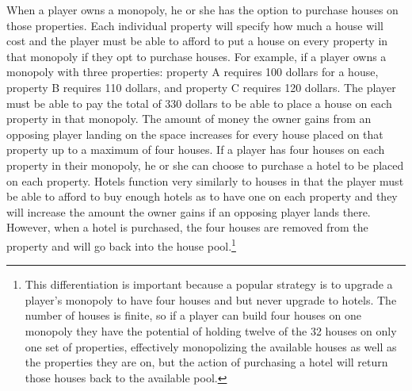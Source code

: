 \documentclass{article}
\begin{document}
When a player owns a monopoly, he or she has the option to purchase houses on those properties.  Each individual property will specify how much a house will cost and the player must be able to afford to put a house on every property in that monopoly if they opt to purchase houses.  For example, if a player owns a monopoly with three properties: property A requires 100 dollars for a house, property B requires 110 dollars, and property C requires 120 dollars.  The player must be able to pay the total of 330 dollars to be able to place a house on each property in that monopoly.  The amount of money the owner gains from an opposing player landing on the space increases for every house placed on that property up to a maximum of four houses.  If a player has four houses on each property in their monopoly, he or she can choose to purchase a hotel to be placed on each property.  Hotels function very similarly to houses in that the player must be able to afford to buy enough hotels as to have one on each property and they will increase the amount the owner gains if an opposing player lands there. However, when a hotel is purchased, the four houses are removed from the property and will go back into the house pool.\cite{rules}\footnote{This differentiation is important because a popular strategy is to upgrade a player's monopoly to have four houses and but never upgrade to hotels.  The number of houses is finite, so if a player can build four houses on one monopoly they have the potential of holding twelve of the 32 houses on only one set of properties, effectively monopolizing the available houses as well as the properties they are on, but the action of purchasing a hotel will return those houses back to the available pool.\cite{strat}} 
\end{document}
